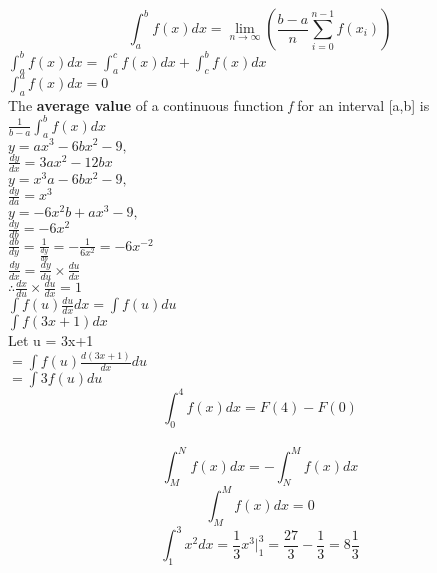 \documentclass{article}
\begin{document}
    \[ \int_{a}^{b}f(x)dx = \lim_{n\to\infty} (\frac{b-a}{n}\sum_{i=0}^{n-1}f(x_i)) \] \bigskip 
    $\int_{a}^{b}f(x)dx = \int_{a}^{c}f(x)dx + \int_{c}^{b}f(x)dx$ \\ \bigskip
    $\int_{a}^{a}f(x)dx = 0$ \\ \bigskip
    The \textbf{average value} of a continuous function \textit{f} for an interval [a,b] is $\frac{1}{b-a}\int_{a}^{b}f(x)dx$ \\ \bigskip
    $y= ax^3-6bx^2-9, $ \\ $ \frac{dy}{dx}= 3ax^2-12bx$ \\ \bigskip
    $y= x^3a-6bx^2-9, $ \\ $ \frac{dy}{da}= x^3 $ \\ \bigskip
    $y= -6x^2b+ax^3-9, $ \\ $ \frac{dy}{db}= -6x^2$ \\
    $\frac{db}{dy} = \frac{1}{\frac{dy}{db}} = -\frac{1}{6x^2} = -6x^{-2}$ \\ \bigskip
    $\frac{dy}{dx} = \frac{dy}{du}\times\frac{du}{dx}$ \\ \bigskip
    $\therefore\frac{dx}{du}\times\frac{du}{dx} = 1$ \\ \bigskip
    $\int f(u)\frac{du}{dx}dx = \int f(u)du$ \\ \smallskip
    $\int f(3x+1)dx$ \\ Let u = 3x+1 \\ \smallskip
    $ = \int f(u)\frac{d(3x+1)}{dx}du$ \\ \smallskip
    $ = \int 3f(u)du$ \\ \bigskip
    \[ \int_{0}^{4} f(x)dx = F(4) - F(0) \] \\ \smallskip
    \[\int_{M}^{N}f(x)dx = -\int_{N}^{M}f(x)dx\]
    \[\int_{M}^{M}f(x)dx = 0\] \bigskip\bigskip\bigskip
    \[\int_{1}^{3}x^2dx=\frac{1}{3}x^3\Big|^3_1=\frac{27}{3}-\frac{1}{3}=8\frac{1}{3}\]
    
\end{document}
